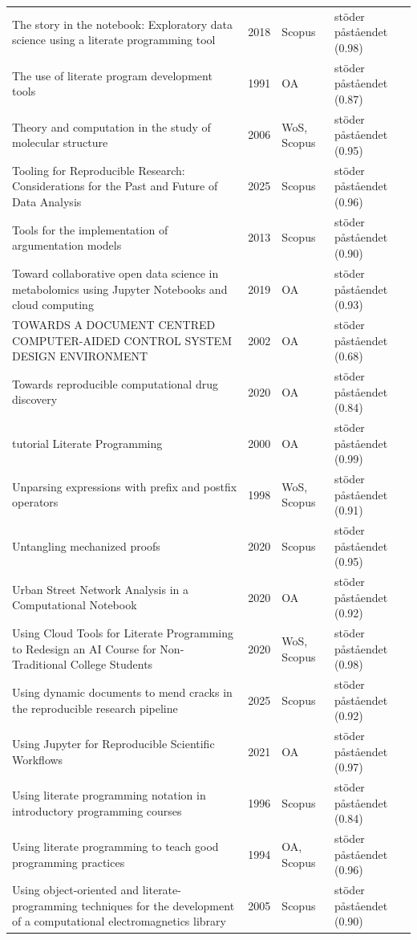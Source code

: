 \begin{longtable}{@{}%
  >{\raggedright\arraybackslash}p{}c%
  >{\raggedright\arraybackslash}p{}%
  >{\raggedright\arraybackslash}p{}@{}}
The story in the notebook: Exploratory data science using a literate programming tool & 2018 & Scopus & stöder påståendet (0.98) \\
The use of literate program development tools & 1991 & OA & stöder påståendet (0.87) \\
Theory and computation in the study of molecular structure & 2006 & WoS, Scopus & stöder påståendet (0.95) \\
Tooling for Reproducible Research: Considerations for the Past and Future of Data Analysis & 2025 & Scopus & stöder påståendet (0.96) \\
Tools for the implementation of argumentation models & 2013 & Scopus & stöder påståendet (0.90) \\
Toward collaborative open data science in metabolomics using Jupyter Notebooks and cloud computing & 2019 & OA & stöder påståendet (0.93) \\
TOWARDS A DOCUMENT CENTRED COMPUTER-AIDED CONTROL SYSTEM DESIGN ENVIRONMENT & 2002 & OA & stöder påståendet (0.68) \\
Towards reproducible computational drug discovery & 2020 & OA & stöder påståendet (0.84) \\
tutorial Literate Programming & 2000 & OA & stöder påståendet (0.99) \\
Unparsing expressions with prefix and postfix operators & 1998 & WoS, Scopus & stöder påståendet (0.91) \\
Untangling mechanized proofs & 2020 & Scopus & stöder påståendet (0.95) \\
Urban Street Network Analysis in a Computational Notebook & 2020 & OA & stöder påståendet (0.92) \\
Using Cloud Tools for Literate Programming to Redesign an AI Course for Non-Traditional College Students & 2020 & WoS, Scopus & stöder påståendet (0.98) \\
Using dynamic documents to mend cracks in the reproducible research pipeline & 2025 & Scopus & stöder påståendet (0.92) \\
Using Jupyter for Reproducible Scientific Workflows & 2021 & OA & stöder påståendet (0.97) \\
Using literate programming notation in introductory programming courses & 1996 & Scopus & stöder påståendet (0.84) \\
Using literate programming to teach good programming practices & 1994 & OA, Scopus & stöder påståendet (0.96) \\
Using object-oriented and literate-programming techniques for the development of a computational electromagnetics library & 2005 & Scopus & stöder påståendet (0.90) \\

\end{longtable}
